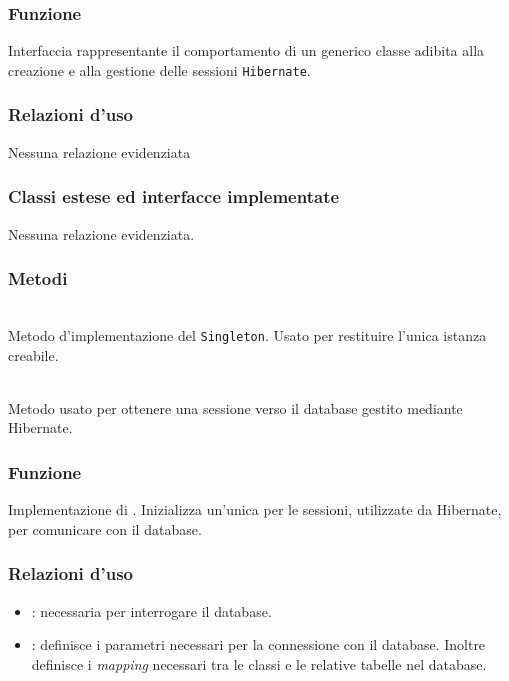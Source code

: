 \subsubsection*{Funzione}
Interfaccia rappresentante il comportamento di un generico classe adibita alla creazione e alla gestione delle sessioni \texttt{Hibernate}.

\subsubsection*{Relazioni d'uso}

Nessuna relazione evidenziata

\subsubsection*{Classi estese ed interfacce implementate}

Nessuna relazione evidenziata.


\subsubsection*{Metodi}
\begin{description}
	\item{}\\
	Metodo d'implementazione del  \texttt{Singleton}. Usato per restituire l'unica istanza creabile.
	\item{}\\
	Metodo usato per ottenere una sessione verso il database gestito mediante Hibernate.
\end{description}


\subsubsection*{Funzione}
Implementazione di . Inizializza un'unica  per le sessioni, utilizzate da Hibernate, per comunicare con il database.

\subsubsection*{Relazioni d'uso}

\begin{itemize}
	\item {}: necessaria per interrogare il database.
	\item {}: definisce i parametri necessari per la connessione con il database. Inoltre definisce i \textit{mapping} necessari tra le classi  e le relative tabelle nel database.
\end{itemize}

